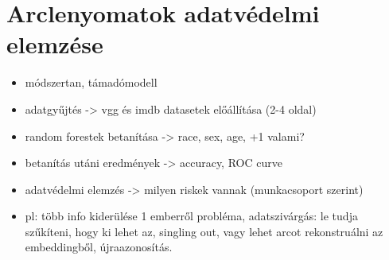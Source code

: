 \section{Arclenyomatok adatvédelmi elemzése}

\begin{itemize}
	\item módszertan, támadómodell
	\item adatgyűjtés -> vgg és imdb datasetek előállítása (2-4 oldal)
	\item random forestek betanítása -> race, sex, age, +1 valami?
	\item betanítás utáni eredmények -> accuracy, ROC curve
	\item adatvédelmi elemzés -> milyen riskek vannak (munkacsoport szerint)
	\item pl: több info kiderülése 1 emberről probléma, adatszivárgás: le tudja szűkíteni, hogy ki lehet az, singling out, vagy lehet arcot rekonstruálni az embeddingből, újraazonosítás.
\end{itemize}